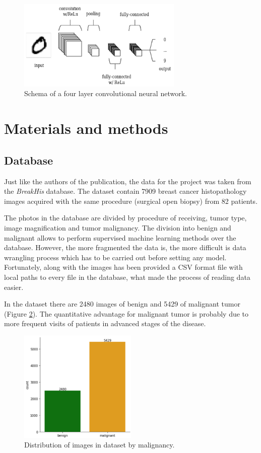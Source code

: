 \documentclass[12pt]{article}
\begin{document}
\begin{figure}[!ht]
\centering
\includegraphics[width=0.7\textwidth]{CNN.png}
\caption{\label{fig:CNN}Schema of a four layer convolutional neural network\cite{7}.}
\end{figure}



\section{Materials and methods}
\subsection{Database}
Just like the authors of the publication\cite{1}, the data for the project was taken from the \textit{BreakHis} database\cite{2}. The dataset contain 7909 breast cancer histopathology images acquired with the same procedure (surgical open biopsy) from 82 patients.

The photos in the database are divided by procedure of receiving, tumor type, image magnification and tumor malignancy. The division into benign and malignant allows to perform supervised machine learning methods over the database. However, the more fragmented the data is, the more difficult is data wrangling process which has to be carried out before setting any model. Fortunately, along with the images has been provided a CSV format file with local paths to every file in the database, what made the process of reading data easier.

In the dataset there are 2480 images of benign and 5429 of malignant tumor (Figure \ref{fig:malignancy}). The quantitative advantage for malignant tumor is probably due to more frequent visits of patients in advanced stages of the disease.

\begin{figure}[!ht]
\centering
\includegraphics[width=0.5\textwidth]{malignancy.png}
\caption{\label{fig:malignancy}Distribution of images in dataset by malignancy.}
\end{figure}
\end{document}
